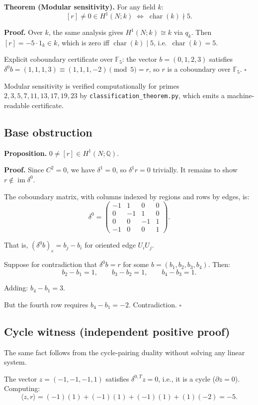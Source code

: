 \textbf{Theorem (Modular sensitivity).}
For any field $k$:
\[
[r]\neq 0\in H^1(N;k)
\;\Longleftrightarrow\;
\operatorname{char}(k)\nmid 5.
\]

\textbf{Proof.}
Over $k$, the same analysis gives $H^1(N;k)\cong k$ via $q_k$. Then
$[r]=-5\cdot 1_k\in k$, which is zero iff $\operatorname{char}(k)\mid 5$, i.e.\
$\operatorname{char}(k)=5$.

Explicit coboundary certificate over $\mathbb{F}_5$: the vector $b=(0,1,2,3)$
satisfies $\delta^0 b=(1,1,1,3)\equiv(1,1,1,-2)\pmod{5}=r$, so $r$ is a
coboundary over $\mathbb{F}_5$. $\square$

Modular sensitivity is verified computationally for primes $2,3,5,7,11,13,17,19,23$
by \texttt{classification\_theorem.py}, which emits a machine-readable certificate.

\subsection{Base obstruction}
\textbf{Proposition.} $0 \neq [r] \in H^1(N;\mathbb{Q})$.

\textbf{Proof.}
Since $C^2 = 0$, we have $\delta^1 = 0$, so $\delta^1 r = 0$ trivially. It remains to show $r \notin \operatorname{im}\delta^0$.

The coboundary matrix, with columns indexed by regions and rows by edges, is:
\[
\delta^0 =
\begin{pmatrix}
-1 & 1 & 0 & 0 \\
0 & -1 & 1 & 0 \\
0 & 0 & -1 & 1 \\
-1 & 0 & 0 & 1
\end{pmatrix}.
\]

That is, $(\delta^0 b)_e = b_j - b_i$ for oriented edge $U_iU_j$.

Suppose for contradiction that $\delta^0 b = r$ for some $b = (b_1, b_2, b_3, b_4)$. Then:
\[
b_2 - b_1 = 1, \qquad b_3 - b_2 = 1, \qquad b_4 - b_3 = 1.
\]

Adding: $b_4 - b_1 = 3$.

But the fourth row requires $b_4 - b_1 = -2$. Contradiction. $\square$

\subsection{Cycle witness (independent positive proof)}
The same fact follows from the cycle-pairing duality without solving any linear system.

The vector $z = (-1,-1,-1,1)$ satisfies $\delta^{0,T} z = 0$, i.e., it is a cycle ($\partial z = 0$). Computing:
\[
\langle z, r \rangle
= (-1)(1) + (-1)(1) + (-1)(1) + (1)(-2)
= -5.
\]

